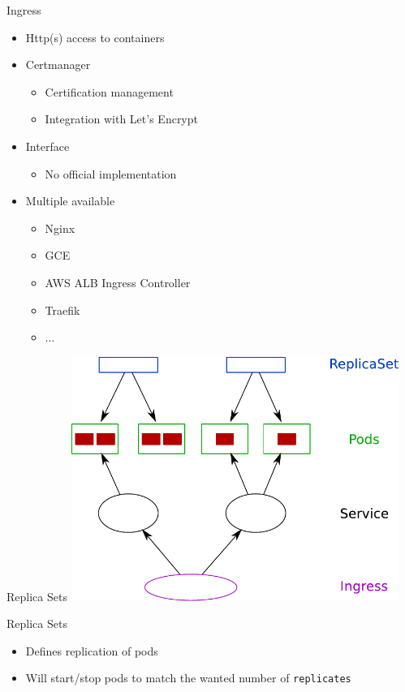 \documentclass{dcpresentation}
\begin{document}
 \begin{frame}{Ingress}
  \begin{itemize}
   \item Http(s) access to containers
   \item Certmanager
   \begin{itemize}
    \item Certification management
    \item Integration with Let's Encrypt
   \end{itemize}
   \item Interface
   \begin{itemize}
    \item No official implementation
   \end{itemize}
   \item Multiple available
   \begin{itemize}
    \item Nginx
    \item GCE
    \item AWS ALB Ingress Controller
    \item Traefik
    \item ...
   \end{itemize}
  \end{itemize}
 \end{frame}
 
 
 \begin{frame}{Replica Sets}
  \centering
  \includegraphics[width=0.8\textwidth]{img/arch-psir.pdf}
 \end{frame}
 
 \begin{frame}{Replica Sets}
  \begin{itemize}
   \item Defines replication of pods
   \item Will start/stop pods to match the wanted number of \texttt{replicates}
  \end{itemize}
 \end{frame}
\end{document}
